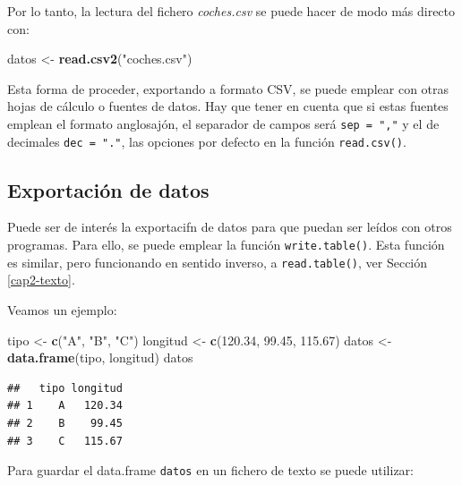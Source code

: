\documentclass[
]{book}
\newenvironment{Shaded}{\begin{snugshade}}{\end{snugshade}}
\newcommand{\FloatTok}[1]{\textcolor[rgb]{0.00,0.00,0.81}{#1}}
\newcommand{\FunctionTok}[1]{\textcolor[rgb]{0.13,0.29,0.53}{\textbf{#1}}}
\newcommand{\NormalTok}[1]{#1}
\newcommand{\OtherTok}[1]{\textcolor[rgb]{0.56,0.35,0.01}{#1}}
\newcommand{\StringTok}[1]{\textcolor[rgb]{0.31,0.60,0.02}{#1}}
\begin{document}
Por lo tanto, la lectura del fichero \emph{coches.csv} se puede hacer de modo
más directo con:

\begin{Shaded}
\begin{Highlighting}[]
\NormalTok{datos }\OtherTok{\textless{}{-}} \FunctionTok{read.csv2}\NormalTok{(}\StringTok{"coches.csv"}\NormalTok{)}
\end{Highlighting}
\end{Shaded}

Esta forma de proceder, exportando a formato CSV, se puede emplear con otras hojas de cálculo o fuentes de datos.
Hay que tener en cuenta que si estas fuentes emplean el formato anglosajón, el separador de campos será \texttt{sep\ =\ ","} y el de decimales \texttt{dec\ =\ "."}, las opciones por defecto en la función \texttt{read.csv()}.

\hypertarget{cap2-exporta}{%
\subsection{Exportación de datos}\label{cap2-exporta}}

Puede ser de interés la exportacifn de datos para que puedan ser leídos con otros programas. Para ello, se puede emplear la función \texttt{write.table()}. Esta función es similar, pero funcionando en sentido inverso, a \texttt{read.table()}, ver Sección \ref{cap2-texto}.

Veamos un ejemplo:

\begin{Shaded}
\begin{Highlighting}[]
\NormalTok{tipo }\OtherTok{\textless{}{-}} \FunctionTok{c}\NormalTok{(}\StringTok{"A"}\NormalTok{, }\StringTok{"B"}\NormalTok{, }\StringTok{"C"}\NormalTok{)}
\NormalTok{longitud }\OtherTok{\textless{}{-}} \FunctionTok{c}\NormalTok{(}\FloatTok{120.34}\NormalTok{, }\FloatTok{99.45}\NormalTok{, }\FloatTok{115.67}\NormalTok{)}
\NormalTok{datos }\OtherTok{\textless{}{-}} \FunctionTok{data.frame}\NormalTok{(tipo, longitud)}
\NormalTok{datos}
\end{Highlighting}
\end{Shaded}

\begin{verbatim}
##   tipo longitud
## 1    A   120.34
## 2    B    99.45
## 3    C   115.67
\end{verbatim}

Para guardar el data.frame \texttt{datos} en un fichero de texto se
puede utilizar:
\end{document}
